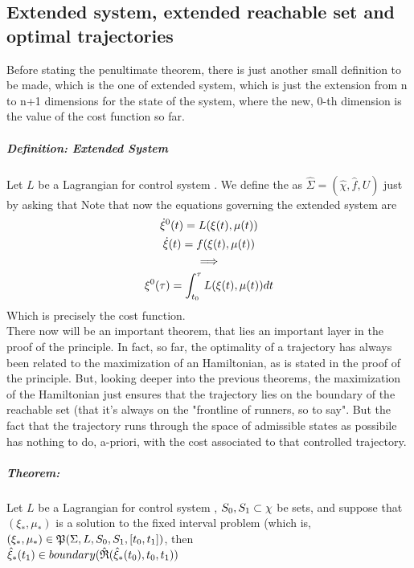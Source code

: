 \subsection{Extended system, extended reachable set and optimal trajectories}
Before stating the penultimate theorem, there is just another small definition to be made, which is the one of extended system, which is just the extension from n to n+1 dimensions for the state of the system, where the new, 0-th dimension is the value of the cost function so far.

\subparagraph[6.1]{Definition: Extended System} Let $L$ be a Lagrangian for control system \controlSystem. We define the  as $\hat{\Sigma}=(\hat\chi,\hat{f},U)$ just by asking that 
Note that now the equations governing the extended system are 
\begin{gather*}
	 \dot{\xi}^0(t)=L(\xi (t),\mu(t))\\
	\dot{\xi}(t)=f(\xi (t),\mu(t))\\
	\implies\\
	\xi^0(\tau)=\int_{t_0}^{\tau}L(\xi (t),\mu(t))dt
\end{gather*}
Which is precisely the cost function.\\
There now will be an important theorem, that lies an important layer in the proof of the principle. In fact, so far, the optimality of a trajectory has always been related to the maximization of an Hamiltonian, as is stated in the proof of the principle. But, looking deeper into the previous theorems, the maximization of the Hamiltonian just ensures that the trajectory lies on the boundary of the reachable set (that it's always on the "frontline of runners, so to say". But the fact that the trajectory runs through the space of admissible states as possibile has nothing to do, a-priori, with the cost associated to that controlled trajectory. 
\subparagraph[6.2]{Theorem:}Let $L$ be a Lagrangian for control system \controlSystem, $S_0,S_1\subset\chi$ be sets, and suppose that $(\xi_*,\mu_*)$ is a solution to the fixed interval problem (which is, $(\xi_*,\mu_*)\in\mathfrak{P}(\Sigma,L,S_0,S_1,[t_0,t_1])$, then\\
$\hat{\xi}_*(t_1)\in boundary(\hat{\mathfrak{R}}(\hat\xi_*(t_0),t_0,t_1))$\\
